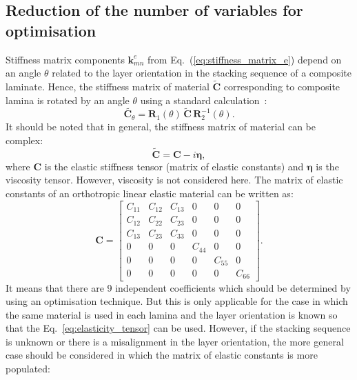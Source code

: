 \documentclass[preprint,12pt]{elsarticle}
\newcommand{\matr}[1]{\mathbf{#1}} %
\newcommand{\bs}[1]{\boldsymbol{#1}}
\begin{document}
 \subsection{Reduction of the number of variables for optimisation}
 Stiffness matrix components \(\matr{k}_{mn}^e\) from 
 Eq.~(\ref{eq:stiffness_matrix_e}) 
 depend on an angle \(\theta\) related to the layer orientation in the stacking sequence of 
 a composite laminate. Hence, the stiffness matrix of material \(\tilde{\matr{C}}\) 
 corresponding to composite lamina is rotated by an angle \(\theta\) using a standard 
 calculation~\cite{Bartoli2006,Taupin2011}:
 \begin{equation}
	\tilde{ \matr{C}_{\theta}}= \matr{R}_1(\theta) \,\tilde{\matr{C}} 
	\,\matr{R}_2^{-1}(\theta).
	 \label{eq:elasticity_tensor}
 \end{equation}
 It should be noted that in general, the stiffness matrix of material can be complex:
 \begin{equation}
 \tilde{\matr{C}}= \matr{C} - i \bs{\eta},
 \label{eq:complex_elasticity_tensor}
 \end{equation}
 where \(\matr{C} \) is the elastic stiffness tensor (matrix of elastic constants) and 
 \(\bs{\eta}\) is the viscosity tensor. However, viscosity is not considered here. The 
 matrix of elastic constants of an orthotropic linear elastic material can be written as:
 \begin{equation}
 \matr{C} = \left[\begin{array}{cccccc} C_{11} & C_{12}& C_{13} & 0&0&0\\[2pt]
 C_{12}& C_{22} & C_{23}& 0&0&0\\[2pt]
 C_{13}&C_{23}&C_{33}&0&0&0\\[2pt]
 0& 0 &0&C_{44}& 0&0\\[2pt]
 0&0&0&0&C_{55}&0\\[2pt]
  0&0&0&0&0&C_{66}
  \end{array}\right]. 
  \label{eq:elastic_constatns}
 \end{equation} 
 It means that there are 9 independent coefficients which should be determined by using 
 an optimisation 
technique. But this is only applicable for the case in which the same material is used in 
each lamina and the 
layer orientation is known so that the Eq.~\ref{eq:elasticity_tensor} can be used. 
However, if the stacking 
sequence is unknown or there is a misalignment in the layer orientation, the more 
general case should be 
considered in which the matrix of elastic constants is more populated:
\end{document}

